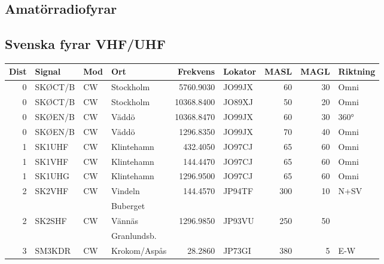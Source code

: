 \clearpage

\begin{landscape}
\section{Amatörradiofyrar}
\subsection{Svenska fyrar VHF/UHF}
\begin{longtable}{rlllrlrrl}
	\bf Dist & \bf Signal & \bf Mod  & \bf Ort      & \bf Frekvens & \bf Lokator & \bf MASL & \bf MAGL & \bf Riktning \\ \hline
	\endhead
	       0 & SKØCT/B    & CW       & Stockholm    &    5760.9030 & JO99JX      &       60 &       30 & Omni         \\
	       0 & SKØCT/B    & CW       & Stockholm    &   10368.8400 & JO89XJ      &       50 &       20 & Omni         \\
	       0 & SKØEN/B    & CW       & Väddö        &   10368.8470 & JO99JX      &       60 &       30 & 360°         \\
	       0 & SKØEN/B    & CW       & Väddö        &    1296.8350 & JO99JX      &       70 &       40 & Omni         \\
	       1 & SK1UHF     & CW       & Klintehamn   &     432.4050 & JO97CJ      &       65 &       60 & Omni         \\
	       1 & SK1VHF     & CW       & Klintehamn   &     144.4470 & JO97CJ      &       65 &       60 & Omni         \\
	       1 & SK1UHG     & CW       & Klintehamn   &    1296.9500 & JO97CJ      &       65 &       60 & Omni         \\
	       2 & SK2VHF     & CW       & Vindeln      &     144.4570 & JP94TF      &      300 &       10 & N+SV         \\
	         &            &          & Buberget     &              &             &          &          &              \\
	       2 & SK2SHF     & CW       & Vännäs       &    1296.9850 & JP93VU      &      250 &       50 &              \\
	         &            &          & Granlundsb.  &              &             &          &          &              \\
	       3 & SM3KDR     & CW       & Krokom/Aspås &      28.2860 & JP73GI      &      380 &        5 & E-W          \\

\end{longtable}
\end{landscape}
